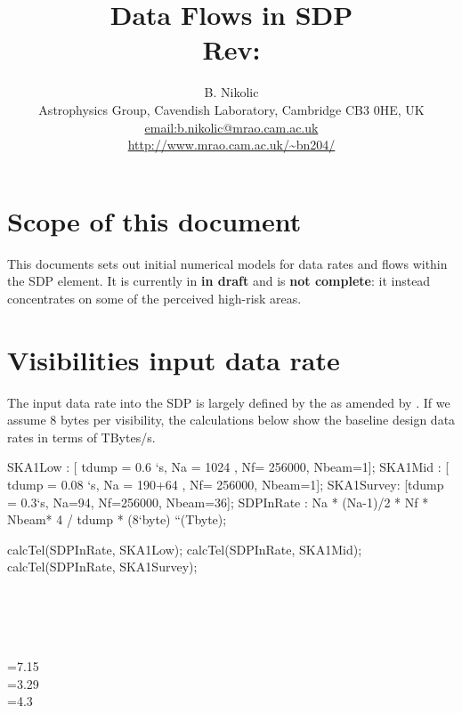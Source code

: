 \documentclass[useAMS,usenatbib,referee]{article}
\title{Data Flows in SDP\\
  Rev: }
\author{B. Nikolic\\
  Astrophysics Group, Cavendish Laboratory, Cambridge CB3 0HE, UK
  \\\url{email:b.nikolic@mrao.cam.ac.uk}
 \\\url{http://www.mrao.cam.ac.uk/~bn204/}}
\begin{document}
\maketitle

\tableofcontents

\section{Scope of this document}

This documents sets out initial numerical models for data rates and
flows within the SDP element. It is currently in {\bf in draft} and is
{\bf not complete}: it instead concentrates on some of the perceived
high-risk areas. 

\section{Visibilities input data rate}

The input data rate into the SDP is largely defined by the
\cite{DewdneyDD001-1} as amended by \cite{McCoolDD003}.  If we assume
8 bytes per visibility, the calculations below show the baseline
design data rates in terms of TBytes/s. 

\begin{maxima}
SKA1Low : [ tdump = 0.6 `s, Na = 1024 , Nf= 256000, Nbeam=1];
SKA1Mid : [ tdump = 0.08 `s, Na = 190+64 , Nf= 256000, Nbeam=1];
SKA1Survey: [tdump = 0.3`s, Na=94, Nf=256000, Nbeam=36];
SDPInRate : Na * (Na-1)/2 * Nf * Nbeam* 4 / tdump * (8`byte) ``(Tbyte);

calcTel(SDPInRate, SKA1Low);
calcTel(SDPInRate, SKA1Mid);
calcTel(SDPInRate, SKA1Survey);

\maximaoutput*
\m  \left[ \mathrm{tdump}=0.6\;\mathrm{s} , N_{\rm a}=1024 , N_{\rm f}=256000 , N_{\rm beam}=1 \right] \\
\m  \left[ \mathrm{tdump}=0.08\;\mathrm{s} , N_{\rm a}=254 , N_{\rm f}=256000 , N_{\rm beam}=1 \right] \\
\m  \left[ \mathrm{tdump}=0.3\;\mathrm{s} , N_{\rm a}=94 , N_{\rm f}=256000 , N_{\rm beam}=36 \right] \\
\; \\
\m  {}=7.15 \\
\m  {}=3.29 \\
\m  {}=4.3 \\
\end{maxima}
\end{document}
